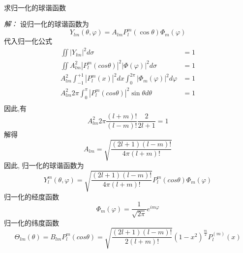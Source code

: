 	~~\\ 
	\begin{example}
		求归一化的球谐函数
	\end{example}
	 \emph{解：}
	 设归一化的球谐函数为
	 \begin{equation*}
		Y_{lm} (\theta,\varphi)= A_{lm}  P_l ^m (\cos \theta)  \Phi_m (\varphi)
	\end{equation*}
	代入归一化公式
		\begin{equation*}
		\begin{split}
			 \iint  |Y_{lm}| ^2  d \sigma & =1  \\
			 \iint  A^2_{lm}  |P_l ^m (cos \theta)|^2  |\Phi (\varphi)|^2 d \sigma  & =1  \\
		 A^2_{lm}\int_{-1}^{+1} |P_l ^m (x)|^2 d x \int_{0}^{2\pi} |\Phi _m (\varphi)|^2 d \varphi  &= 1 \\
		A^2_{lm} 2\pi  \int_{0}^{\pi}    |P_l ^m (cos \theta)|^2  \sin \theta d\theta &=1 \\
		\end{split}		
		\end{equation*}	
	因此,有
	$$
		A^2_{lm}  2\pi  \frac{(l+m)!}{(l-m)!}  \frac{2}{2l+1}  =1   
	$$ 
		解得\[ A_{lm} = \sqrt{\frac{(2l+1)(l-m)!}{4\pi (l+m)!}}\]
	因此, 归一化的球谐函数为
	\begin{equation*}
		Y_{l}^m (\theta,\varphi)= \sqrt{\frac{(2l+1)(l-m)!}{4\pi (l+m)!}}  P_l ^m (cos \theta)  \Phi_m (\varphi)
	\end{equation*}
	归一化的经度函数
	\begin{equation*}
		\Phi_m (\varphi) = \frac{1}{\sqrt{2\pi}} e^{im\varphi}
	\end{equation*}
	归一化的纬度函数
	\begin{equation*}
		\Theta_{lm}(\theta) = B_{lm} P_l ^m (cos \theta)= \sqrt{\frac{(2l+1)(l-m)!}{2 (l+m)!}}  (1-x^2)^{\frac{m}{2}}P^{(m)} _l(x)
	\end{equation*}
	
